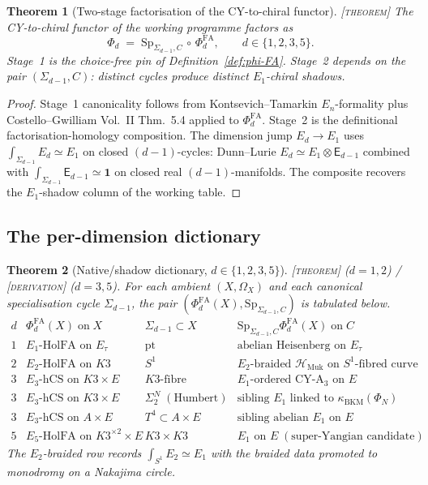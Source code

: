 \documentclass[11pt]{amsart}
\providecommand{\cH}{\mathcal{H}}
\providecommand{\Sp}{\mathrm{Sp}}
\providecommand{\MUk}{\mathrm{Muk}}
\providecommand{\Eone}{E_1}
\providecommand{\Etwo}{E_2}
\providecommand{\Ethree}{E_3}
\providecommand{\Efive}{E_5}
\providecommand{\Ed}{E_d}
\providecommand{\En}{E_n}
\providecommand{\kBKM}{\kappa_{\mathrm{BKM}}}
\providecommand{\Phifun}{\Phi}
\providecommand{\PhiFA}{\Phi^{\mathrm{FA}}}
\providecommand{\ClaimStatusTheorem}{\textsc{[theorem]}}
\providecommand{\ClaimStatusDerivation}{\textsc{[derivation]}}
\theoremstyle{plain}
\newtheorem{theorem}{Theorem}[section]
\theoremstyle{definition}
\theoremstyle{remark}
\begin{document}
\begin{theorem}[Two-stage factorisation of the CY-to-chiral functor]
\label{thm:two-stage}
\ClaimStatusTheorem{}\;
The CY-to-chiral functor of the working programme factors as
\[
\Phifun_d\;=\;\Sp_{\Sigma_{d-1},C}\,\circ\,\PhiFA_d,
\qquad
d\in\{1,2,3,5\}.
\]
Stage~1 is the choice-free pin of Definition~\ref{def:phi-FA}.
Stage~2 depends on the pair $(\Sigma_{d-1}, C)$: distinct cycles
produce distinct $\Eone$-chiral shadows.
\end{theorem}

\begin{proof}
Stage~1 canonicality follows from Kontsevich--Tamarkin
$\En$-formality plus Costello--Gwilliam Vol.~II Thm.~5.4 applied to
$\PhiFA_d$. Stage~2 is the definitional factorisation-homology
composition. The dimension jump
$\Ed\to\Eone$ uses $\int_{\Sigma_{d-1}}\Ed \simeq \Eone$ on closed
$(d-1)$-cycles: Dunn--Lurie $\Ed\simeq\Eone\otimes\mathsf{E}_{d-1}$
combined with
$\int_{\Sigma_{d-1}}\mathsf{E}_{d-1}\simeq\mathbf{1}$ on closed real
$(d-1)$-manifolds. The composite recovers the $\Eone$-shadow column
of the working table.
\end{proof}

\subsection{The per-dimension dictionary}

\begin{theorem}[Native/shadow dictionary, $d\in\{1,2,3,5\}$]
\label{thm:dictionary}
\ClaimStatusTheorem{} ($d=1,2$) \;/\; \ClaimStatusDerivation{}
($d=3,5$).
For each ambient $(X,\Omega_X)$ and each canonical specialisation
cycle $\Sigma_{d-1}$, the pair $(\PhiFA_d(X), \Sp_{\Sigma_{d-1},C})$
is tabulated below.
\[
\begin{array}{c|c|c|c}
d & \PhiFA_d(X) \;\text{on}\; X & \Sigma_{d-1}\subset X &
\Sp_{\Sigma_{d-1},C}\PhiFA_d(X) \;\text{on}\; C\\
\hline
1 & \Eone\text{-HolFA on } E_\tau & \mathrm{pt} & \text{abelian
Heisenberg on }E_\tau\\
2 & \Etwo\text{-HolFA on } K3 & S^1 & \Etwo\text{-braided }
\cH_{\MUk}\text{ on }S^1\text{-fibred curve}\\
3 & \Ethree\text{-hCS on }K3\times E & K3\text{-fibre} &
\Eone\text{-ordered CY-A}_3\text{ on }E\\
3 & \Ethree\text{-hCS on }K3\times E & \Sigma_2^N\;(\text{Humbert}) &
\text{sibling }\Eone\text{ linked to }\kBKM(\Phi_N)\\
3 & \Ethree\text{-hCS on }A\times E & T^4\subset A\times E &
\text{sibling abelian }\Eone\text{ on }E\\
5 & \Efive\text{-HolFA on }K3^{\times 2}\times E & K3\times K3 &
\Eone\text{ on }E\;(\text{super-Yangian candidate})
\end{array}
\]
The $\Etwo$-braided row records $\int_{S^1}\Etwo\simeq\Eone$ with the
braided data promoted to monodromy on a Nakajima circle.
\end{theorem}
\end{document}
